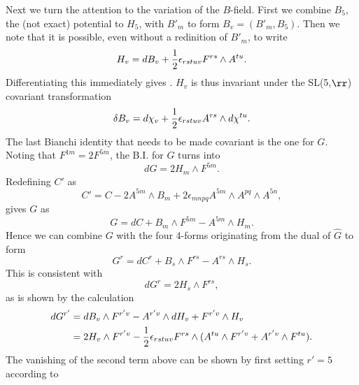 Next we turn the attention to the variation of the $B$-field. First we combine $B_5$, the (not exact) potential to $H_5$, 
with $B'_m$ to form $B_v=(B'_m,B_5)$. Then we note that it is possible, even without a redinition of $B'_m$, to write
\begin{equation}
H_v=dB_v + {1 \over 2}\epsilon_{rstuv}F^{rs} \wedge A^{tu}.
\end{equation}
Differentiating this immediately gives . $H_v$ is thus invariant under the SL(5,$\rr$) covariant transformation
\begin{equation}
\delta B_v = d\chi_v + {1 \over 2}\epsilon_{rstuv}A^{rs} \wedge d\chi^{tu}.
\end{equation}
The last Bianchi identity that needs to be made covariant is the one for $G$. Noting that $F^{1m}=2F^{5m}$, the B.I. for $G$ turns into
\begin{equation}
dG=2H_m \wedge F^{5m}.
\end{equation}
Redefining $C'$ as
\begin{equation}
C'=C-2A^{5m} \wedge B_m + 2\epsilon_{mnpq}A^{5m} \wedge A^{pq} \wedge A^{5n},
\end{equation}
gives $G$ as
\begin{equation}
G=dC+B_m \wedge F^{5m} - A^{5m} \wedge H_m.
\end{equation}
Hence we can combine $G$ with the four 4-forms originating from the dual of $\hat{G}$ to form
\begin{equation}
G^r=dC^r + B_s \wedge F^{rs} - A^{rs} \wedge H_s.
\label{awedc}
\end{equation}
This is consistent with
\begin{equation}
dG^r=2H_s \wedge F^{rs},
\end{equation}
as is shown by the calculation
\begin{align}
dG^{r'}&=dB_v \wedge F^{r'v} -A^{r'v} \wedge dH_v + F^{r'v} \wedge H_v \nonumber \\
&=2H_v \wedge F^{r'v} - {1 \over 2}\epsilon_{rstuv}F^{rs} \wedge (A^{tu} \wedge F^{r'v} + A^{r'v} \wedge F^{tu}).
\end{align}
The vanishing of the second term above can be shown by first setting $r'=5$ according to
